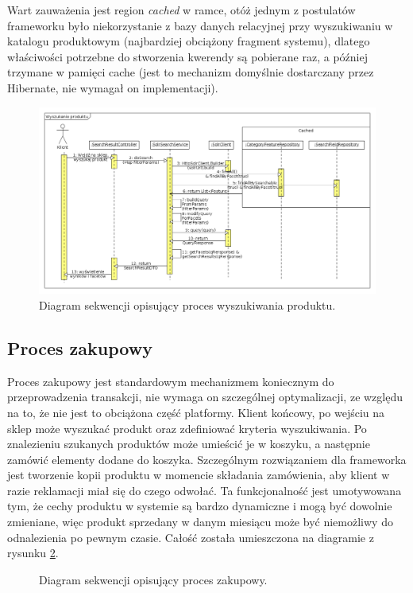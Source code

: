 Wart zauważenia jest region \textit{cached} w ramce, otóż jednym z postulatów frameworku było niekorzystanie z bazy danych relacyjnej przy wyszukiwaniu w katalogu produktowym (najbardziej obciążony fragment systemu), dlatego właściwości potrzebne do stworzenia kwerendy są pobierane raz, a później trzymane w pamięci cache (jest to mechanizm domyślnie dostarczany przez Hibernate, nie wymagał on implementacji). 
  \begin{figure}
	\begin{center}
		\includegraphics[scale=0.38]{wyszukanieProdSekw.png}
	\end{center}
	\caption{{\color{black}Diagram sekwencji opisujący proces wyszukiwania produktu.}} \label{wyszukiwanieProdSekw}
\end{figure}



\subsection{Proces zakupowy}
Proces zakupowy jest standardowym mechanizmem koniecznym do przeprowadzenia transakcji, nie wymaga on szczególnej optymalizacji, ze względu na to, że nie jest to obciążona część platformy. Klient końcowy, po wejściu na sklep może wyszukać produkt oraz zdefiniować kryteria wyszukiwania. Po znalezieniu szukanych produktów może umieścić je w koszyku, a następnie zamówić elementy dodane do koszyka. Szczególnym rozwiązaniem dla frameworka jest tworzenie kopii produktu w momencie składania zamówienia, aby klient w razie reklamacji miał się do czego odwołać. Ta funkcjonalność jest umotywowana tym, że cechy produktu w systemie są bardzo dynamiczne i mogą być dowolnie zmieniane, więc produkt sprzedany w danym miesiącu może być niemożliwy do odnalezienia po pewnym czasie. Całość została umieszczona na diagramie z rysunku \ref{procZakup}.
\begin{figure}
	\begin{center}
	\end{center}
	\caption{{\color{black}Diagram sekwencji opisujący proces zakupowy.}} \label{procZakup}
\end{figure}


